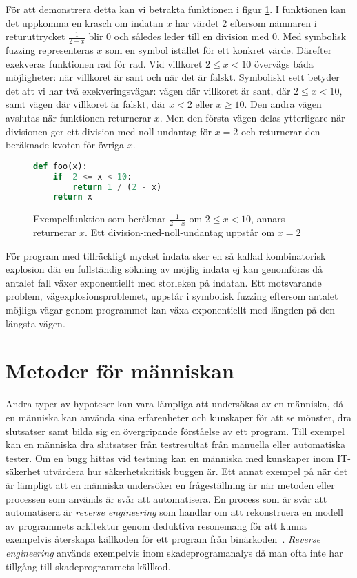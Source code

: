 För att demonstrera detta kan vi betrakta funktionen i figur
\ref{fig:symb_exc_ex_inl}. I funktionen kan det uppkomma en krasch om indatan
$x$ har värdet 2 eftersom nämnaren i returuttrycket $\frac{1}{2 - x}$ blir 0 och
således leder till en division med 0. Med symbolisk fuzzing representeras $x$
som en symbol istället för ett konkret värde. Därefter exekveras funktionen rad
för rad. Vid villkoret $2 \le x < 10$ övervägs båda möjligheter: när villkoret
är sant och när det är falskt. Symboliskt sett betyder det att vi har två
exekveringsvägar: vägen där villkoret är sant, där $2 \le x<10$, samt vägen där
villkoret är falskt, där $x < 2$ eller $x \ge 10$. Den andra vägen avslutas när
funktionen returnerar $x$. Men den första vägen delas ytterligare när
divisionen ger ett division-med-noll-undantag för $x=2$ och returnerar den
beräknade kvoten för övriga $x$.

\begin{figure}[h!]
    \centering
    \begin{lstlisting}[language=Python]
def foo(x):
    if  2 <= x < 10:
        return 1 / (2 - x)
    return x
	\end{lstlisting}
    \caption{
        Exempelfunktion som beräknar $\frac{1}{2 - x}$ om $2 \le x < 10$, annars returnerar $x$.
        Ett division-med-noll-undantag uppstår om $x = 2$}
    \label{fig:symb_exc_ex_inl}
\end{figure}

För program med tillräckligt mycket indata sker en så kallad kombinatorisk
explosion där en fullständig sökning av möjlig indata ej kan genomföras då
antalet fall växer exponentiellt med storleken på indatan. Ett motsvarande
problem, vägexplosionsproblemet, uppstår i symbolisk fuzzing eftersom
antalet möjliga vägar genom programmet kan växa exponentiellt med längden på den
längsta vägen.

\section{Metoder för människan}

Andra typer av hypoteser kan vara lämpliga att undersökas av en människa, då en
människa kan använda sina erfarenheter och kunskaper för att se mönster, dra
slutsatser samt bilda sig en övergripande förståelse av ett program. Till
exempel kan en människa dra slutsatser från testresultat från manuella eller
automatiska tester. Om en bugg hittas vid testning kan en människa med
kunskaper inom IT-säkerhet utvärdera hur säkerhetskritisk buggen är. Ett annat
exempel på när det är lämpligt att en människa undersöker en frågeställning är
när metoden eller processen som används är svår att automatisera. En process
som är svår att automatisera är \emph{reverse engineering} som handlar om att
rekonstruera en modell av programmets arkitektur genom deduktiva resonemang för
att kunna exempelvis återskapa källkoden för ett program från
binärkoden~\cite{on_rev_eng}. \emph{Reverse engineering} används exempelvis
inom skadeprogramanalys då man ofta inte har tillgång till skadeprogrammets
källkod.

